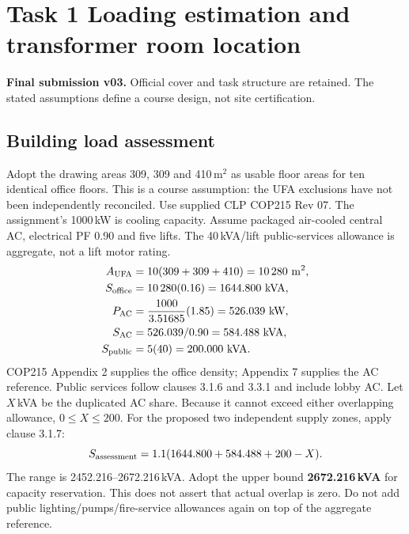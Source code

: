 \documentclass[11pt,a4paper]{article}
\newcommand{\task}[1]{\clearpage\section*{#1}}
\begin{document}

\task{Task 1 Loading estimation and transformer room location}
\textbf{Final submission v03.} Official cover and task structure are retained. The stated assumptions define a course design, not site certification.
\subsection*{Building load assessment}
Adopt the drawing areas 309, 309 and 410\,m$^2$ as usable floor areas for ten identical office floors. This is a course assumption: the UFA exclusions have not been independently reconciled. Use supplied CLP COP215 Rev 07. The assignment's 1000\,kW is cooling capacity. Assume packaged air-cooled central AC, electrical PF 0.90 and five lifts. The 40\,kVA/lift public-services allowance is aggregate, not a lift motor rating.
\begin{align*}
A_{\rm UFA}&=10(309+309+410)=10\,280\ {\rm m^2},\\
S_{\rm office}&=10\,280(0.16)=1644.800\ {\rm kVA},\\
P_{\rm AC}&=\frac{1000}{3.51685}(1.85)=526.039\ {\rm kW},\\
S_{\rm AC}&=526.039/0.90=584.488\ {\rm kVA},\\
S_{\rm public}&=5(40)=200.000\ {\rm kVA}.
\end{align*}
COP215 Appendix 2 supplies the office density;  Appendix 7 supplies the AC reference. Public services follow clauses 3.1.6 and 3.3.1 and include lobby AC. Let $X$\,kVA be the duplicated AC share. Because it cannot exceed either overlapping allowance, $0\le X\le 200$. For the proposed two independent supply zones, apply clause 3.1.7:
\[
S_{\rm assessment}=1.1(1644.800+584.488+200-X).
\]
The range is 2452.216--2672.216\,kVA. Adopt the upper bound \textbf{2672.216\,kVA} for capacity reservation. This does not assert that actual overlap is zero. Do not add public lighting/pumps/fire-service allowances again on top of the aggregate reference.
\end{document}
